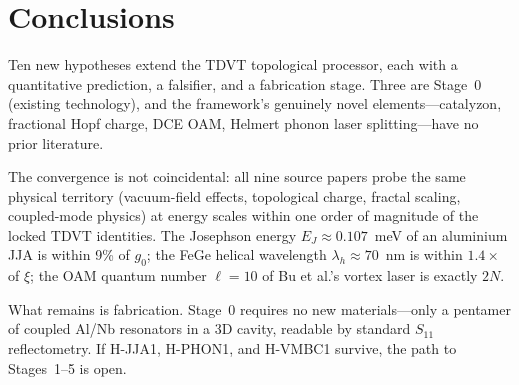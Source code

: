 \documentclass[11pt,letterpaper]{article}
\newcommand{\gzero}{g_0}
\begin{document}
\section{Conclusions}\label{sec:conclusions}

Ten new hypotheses extend the TDVT topological processor, each with a quantitative prediction, a falsifier, and a fabrication stage.  Three are Stage~0 (existing technology), and the framework's genuinely novel elements---catalyzon, fractional Hopf charge, DCE OAM, Helmert phonon laser splitting---have no prior literature.

The convergence is not coincidental: all nine source papers probe the same physical territory (vacuum-field effects, topological charge, fractal scaling, coupled-mode physics) at energy scales within one order of magnitude of the locked TDVT identities.  The Josephson energy $E_J \approx 0.107$~meV of an aluminium JJA is within 9\% of $\gzero$; the FeGe helical wavelength $\lambda_h \approx 70$~nm is within $1.4\times$ of $\xi$; the OAM quantum number $\ell = 10$ of Bu et al.'s vortex laser is exactly $2N$.

What remains is fabrication.  Stage~0 requires no new materials---only a pentamer of coupled Al/Nb resonators in a 3D cavity, readable by standard $S_{11}$ reflectometry.  If H-JJA1, H-PHON1, and H-VMBC1 survive, the path to Stages~1--5 is open.
\end{document}
